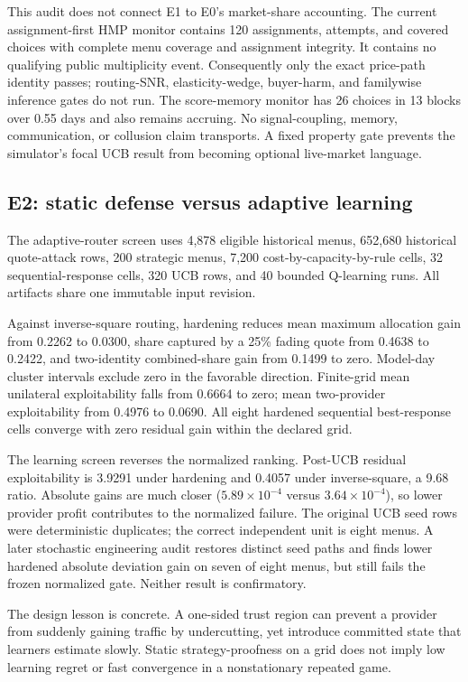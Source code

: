 \documentclass[10pt]{article}
\newcommand{\1}{\mathbf 1}
\begin{document}
This audit does not connect E1 to E0's market-share accounting.  The current
assignment-first HMP monitor contains 120 assignments, attempts, and covered
choices with complete menu coverage and assignment integrity.  It contains no
qualifying public multiplicity event.  Consequently only the exact price-path
identity passes; routing-SNR, elasticity-wedge, buyer-harm, and familywise
inference gates do not run.  The score-memory monitor has 26 choices in 13 blocks
over 0.55 days and also remains accruing.  No signal-coupling, memory,
communication, or collusion claim transports.  A fixed property gate prevents
the simulator's focal UCB result from becoming optional live-market language.

\subsection{E2: static defense versus adaptive learning}

The adaptive-router screen uses 4,878 eligible historical menus, 652,680
historical quote-attack rows, 200 strategic menus, 7,200 cost-by-capacity-by-rule
cells, 32 sequential-response cells, 320 UCB rows, and 40 bounded Q-learning runs.
All artifacts share one immutable input revision.

Against inverse-square routing, hardening reduces mean maximum allocation gain
from 0.2262 to 0.0300, share captured by a 25\% fading quote from 0.4638 to 0.2422,
and two-identity combined-share gain from 0.1499 to zero.  Model-day cluster
intervals exclude zero in the favorable direction.  Finite-grid mean unilateral
exploitability falls from 0.6664 to zero; mean two-provider exploitability from
0.4976 to 0.0690.  All eight hardened sequential best-response cells converge
with zero residual gain within the declared grid.

The learning screen reverses the normalized ranking.  Post-UCB residual
exploitability is 3.9291 under hardening and 0.4057 under inverse-square, a 9.68
ratio.  Absolute gains are much closer ($5.89\times10^{-4}$ versus
$3.64\times10^{-4}$), so lower provider profit contributes to the normalized
failure.  The original UCB seed rows were deterministic duplicates; the correct
independent unit is eight menus.  A later stochastic engineering audit restores
distinct seed paths and finds lower hardened absolute deviation gain on seven of
eight menus, but still fails the frozen normalized gate.  Neither result is
confirmatory.

The design lesson is concrete.  A one-sided trust region can prevent a provider
from suddenly gaining traffic by undercutting, yet introduce committed state that
learners estimate slowly.  Static strategy-proofness on a grid does not imply low
learning regret or fast convergence in a nonstationary repeated game.
\end{document}
